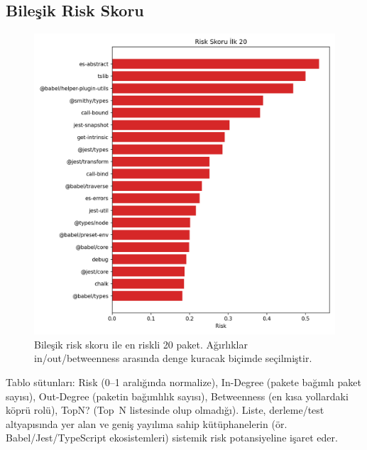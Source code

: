 \documentclass[11pt,a4paper]{article}
\begin{document}
\subsection{Bileşik Risk Skoru}
\begin{figure}[H]
  \centering
  \includegraphics{top20_risk.png}
  \caption{Bileşik risk skoru ile en riskli 20 paket. Ağırlıklar in/out/betweenness arasında denge kuracak biçimde seçilmiştir.}
\end{figure}

\noindent Tablo sütunları: Risk (0--1 aralığında normalize), In-Degree (pakete bağımlı paket sayısı), Out-Degree (paketin bağımlılık sayısı), Betweenness (en kısa yollardaki köprü rolü), TopN? (Top~N listesinde olup olmadığı). Liste, derleme/test altyapısında yer alan ve geniş yayılıma sahip kütüphanelerin (ör. Babel/Jest/TypeScript ekosistemleri) sistemik risk potansiyeline işaret eder.
\end{document}
